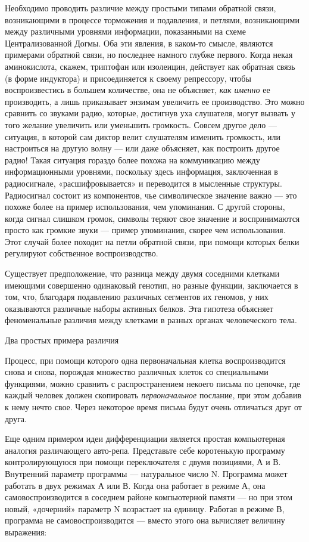 Необходимо проводить различие между простыми типами обратной связи, возникающими в процессе торможения и подавления, и петлями, возникающими между различными уровнями информации, показанными на схеме Централизованной Догмы. Оба эти явления, в каком-то смысле, являются примерами обратной связи, но последнее намного глубже первого. Когда некая аминокислота, скажем, триптофан или изолеицин, действует как обратная связь (в форме индуктора) и присоединяется к своему репрессору, чтобы воспроизвестись в большем количестве, она не объясняет, \emph{как именно} ее производить, а лишь приказывает энзимам увеличить ее производство. Это можно сравнить со звуками радио, которые, достигнув уха слушателя, могут вызвать у того желание увеличить или уменьшить громкость. Совсем другое дело --- ситуация, в которой сам диктор велит слушателям изменить громкость, или настроиться на другую волну --- или даже объясняет, как построить другое радио! Такая ситуация гораздо более похожа на коммуникацию между информационными уровнями, поскольку здесь информация, заключенная в радиосигнале, «расшифровывается» и переводится в мысленные структуры. Радиосигнал состоит из компонентов, чье символическое значение важно --- это похоже более на пример использования, чем упоминания. С другой стороны, когда сигнал слишком громок, символы теряют свое значение и воспринимаются просто как громкие звуки --- пример упоминания, скорее чем использования. Этот случай более походит на петли обратной связи, при помощи которых белки регулируют собственное воспроизводство.

Существует предположение, что разница между двумя соседними клетками имеющими совершенно одинаковый генотип, но разные функции, заключается в том, что, благодаря подавлению различных сегментов их геномов, у них оказываются различные наборы активных белков. Эта гипотеза объясняет феноменальные различия между клетками в разных органах человеческого тела.

Два простых примера различия

Процесс, при помощи которого одна первоначальная клетка воспроизводится снова и снова, порождая множество различных клеток со специальными функциями, можно сравнить с распространением некоего письма по цепочке, где каждый человек должен скопировать \emph{первоначальное} послание, при этом добавив к нему нечто свое. Через некоторое время письма будут очень отличаться друг от друга.

Еще одним примером идеи дифференциации является простая компьютерная аналогия различающего авто-репа. Представьте себе коротенькую программу контролирующуюся при помощи переключателя с двумя позициями, А и В. Внутренний параметр программы --- натуральное число N. Программа может работать в двух режимах А или В. Когда она работает в режиме А, она самовоспроизводится в соседнем районе компьютерной памяти --- но при этом новый, «дочерний» параметр N возрастает на единицу. Работая в режиме В, программа не самовоспроизводится --- вместо этого она вычисляет величину выражения:

